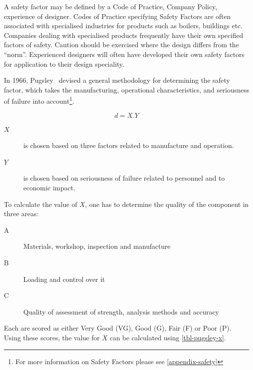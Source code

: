 A safety factor may be defined by a Code of Practice, Company Policy, experience of designer. Codes of Practice specifying Safety Factors are often associated with specialised industries for products such as boilers, buildings etc. Companies dealing with specialised products frequently have their own specified factors of safety. Caution should be exercised where the design differs from the ``norm''. Experienced designers will often have developed their own safety factors for application to their design speciality.


In 1966, Pugsley~\cite{howard1967} devised a general methodology for determining the safety factor, which takes the manufacturing, operational characteristics, and seriousness of failure into account\footnote{For more information on Safety Factors please see \cref{appendix-safety}}.

\begin{equation}
  d = X.Y
\end{equation}

\begin{description}
  \item[\(X\)] is chosen based on three factors related to manufacture and operation.
  \item[\(Y\)] is chosen based on seriousness of failure related to personnel and to economic impact.
\end{description}

To calculate the value of \(X\), one has to determine the quality of the component in three areas:

\begin{description}
  \item[A] Materials, workshop, inspection and manufacture
  \item[B] Loading and control over it
  \item[C] Quality of assessment of strength, analysis methods and accuracy
\end{description}

Each are scored as either Very Good (VG), Good (G), Fair (F) or Poor (P). Using these scores, the value for \(X\) can be calculated using \cref{tbl-pugsley-x}.

